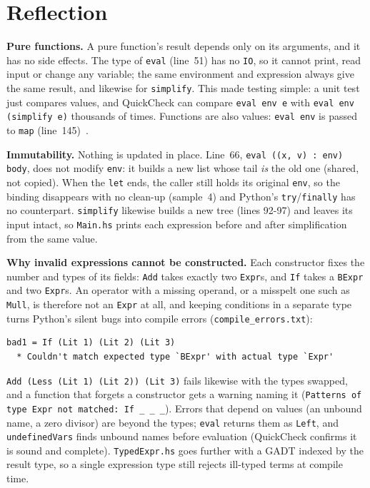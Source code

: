 \documentclass[12pt, a4paper]{report}
\newcommand{\code}[1]{\texttt{#1}}
\begin{document}


\section{Reflection}\label{sec:reflect}
\textbf{Pure functions.} A pure function's result depends only on its
arguments, and it has no side effects. The type of \code{eval} (line~51) has
no \code{IO}, so it cannot print, read input or change any variable; the same
environment and expression always give the same result, and likewise for
\code{simplify}. This made testing simple: a unit test just compares values,
and QuickCheck can compare \code{eval env e} with
\code{eval env (simplify e)} thousands of times. Functions are also values:
\code{eval env} is passed to \code{map} (line~145)~\cite{hughes1989why}.

\textbf{Immutability.} Nothing is updated in place. Line~66,
\code{eval ((x, v) : env) body}, does not modify \code{env}: it builds a new
list whose tail \emph{is} the old one (shared, not copied). When the
\code{let} ends, the caller still holds its original \code{env}, so the
binding disappears with no clean-up (sample~4) and Python's
\code{try}/\code{finally} has no counterpart. \code{simplify} likewise builds a
new tree (lines 92-97) and leaves its input intact, so \code{Main.hs}
prints each expression before and after simplification from the same value.

\textbf{Why invalid expressions cannot be constructed.} Each constructor fixes
the number and types of its fields: \code{Add} takes exactly two \code{Expr}s,
and \code{If} takes a \code{BExpr} and two \code{Expr}s. An operator with a
missing operand, or a misspelt one such as \code{Mull}, is therefore not an
\code{Expr} at all, and keeping conditions in a separate type turns Python's
silent bugs into compile errors (\code{compile\_errors.txt}):
\begin{lstlisting}[style=plain]
bad1 = If (Lit 1) (Lit 2) (Lit 3)
  * Couldn't match expected type `BExpr' with actual type `Expr'
\end{lstlisting}
\code{Add (Less (Lit 1) (Lit 2)) (Lit 3)} fails likewise with the types
swapped, and a function that forgets a constructor gets a warning naming it
(\code{Patterns of type \textasciigrave Expr\textquotesingle{} not matched: If \_ \_ \_}). Errors that depend
on values (an unbound name, a zero divisor) are beyond the types; \code{eval}
returns them as \code{Left}, and \code{undefinedVars} finds unbound names
before evaluation (QuickCheck confirms it is sound and complete).
\code{TypedExpr.hs} goes further with a GADT indexed by the result type, so a
single expression type still rejects ill-typed terms at compile time.
\end{document}
